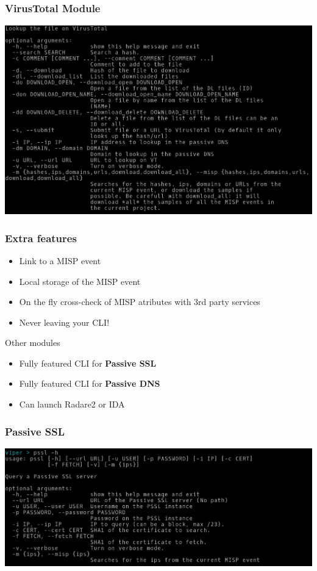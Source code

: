 \begin{frame}[fragile]
    \frametitle{VirusTotal Module}
    \includegraphics[scale=0.32]{vt.png}
\end{frame}

\begin{frame}[fragile]
    \frametitle{Extra features}
    \begin{itemize}
        \item Link to a MISP event
        \item Local storage of the MISP event
        \item On the fly cross-check of MISP atributes with 3rd party services
        \item Never leaving your CLI!
    \end{itemize}
\end{frame}

\begin{frame}[fragile]{Other modules}
    \begin{itemize}
        \item Fully featured CLI for {\bf Passive SSL}
        \item Fully featured CLI for {\bf Passive DNS}
        \item Can launch Radare2 or IDA
    \end{itemize}
\end{frame}

\begin{frame}[fragile]
    \frametitle{Passive SSL}
    \includegraphics[scale=0.32]{pssl.png}
\end{frame}

